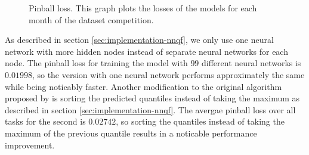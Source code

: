 \begin{figure}[ht]
    \centering
    
    \caption[Pinball loss]{Pinball loss. 
    This graph plots the losses of the models for each month of the dataset competition.}
    \label{fig:pinball-loss}
\end{figure}

As described in section \ref{sec:implementation-nnqf}, 
we only use one neural network with more hidden nodes instead of 
separate neural networks for each node. 
The pinball loss for training the model with \(99\) different neural networks 
is \(0.01998\), so the version with one neural network performs approximately the 
same while being noticably faster. 
Another modification to the original algorithm proposed by \Textcite{Ordiano2019} 
is sorting the predicted quantiles instead of taking the maximum as described in 
section \ref{sec:implementation-nnqf}. The avergae pinball loss over all tasks for the second is 
\(0.02742\), so sorting the quantiles instead of taking the maximum of the previous quantile 
results in a noticable performance improvement.
